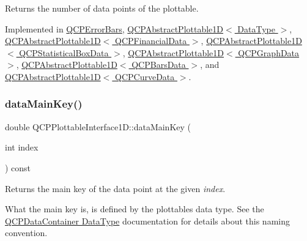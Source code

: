 Returns the number of data points of the plottable. 

Implemented in \hyperlink{class_q_c_p_error_bars_ad8811b034a17cb4ef898cbcc8da29bd2}{Q\+C\+P\+Error\+Bars}, \hyperlink{class_q_c_p_abstract_plottable1_d_a354545da303458283df3f7948a7a768b}{Q\+C\+P\+Abstract\+Plottable1\+D$<$ Data\+Type $>$}, \hyperlink{class_q_c_p_abstract_plottable1_d_a354545da303458283df3f7948a7a768b}{Q\+C\+P\+Abstract\+Plottable1\+D$<$ Q\+C\+P\+Financial\+Data $>$}, \hyperlink{class_q_c_p_abstract_plottable1_d_a354545da303458283df3f7948a7a768b}{Q\+C\+P\+Abstract\+Plottable1\+D$<$ Q\+C\+P\+Statistical\+Box\+Data $>$}, \hyperlink{class_q_c_p_abstract_plottable1_d_a354545da303458283df3f7948a7a768b}{Q\+C\+P\+Abstract\+Plottable1\+D$<$ Q\+C\+P\+Graph\+Data $>$}, \hyperlink{class_q_c_p_abstract_plottable1_d_a354545da303458283df3f7948a7a768b}{Q\+C\+P\+Abstract\+Plottable1\+D$<$ Q\+C\+P\+Bars\+Data $>$}, and \hyperlink{class_q_c_p_abstract_plottable1_d_a354545da303458283df3f7948a7a768b}{Q\+C\+P\+Abstract\+Plottable1\+D$<$ Q\+C\+P\+Curve\+Data $>$}.

\mbox{\label{class_q_c_p_plottable_interface1_d_a2bd60daaac046945fead558cbd83cf73}} 
\subsubsection{\texorpdfstring{data\+Main\+Key()}{dataMainKey()}}
{\footnotesize\ttfamily double Q\+C\+P\+Plottable\+Interface1\+D\+::data\+Main\+Key (\begin{DoxyParamCaption}\item[{int}]{index }\end{DoxyParamCaption}) const\hspace{0.3cm}{\ttfamily [pure virtual]}}

Returns the main key of the data point at the given {\itshape index}.

What the main key is, is defined by the plottable\textquotesingle{}s data type. See the \hyperlink{class_q_c_p_data_container_qcpdatacontainer-datatype}{Q\+C\+P\+Data\+Container Data\+Type} documentation for details about this naming convention. 

